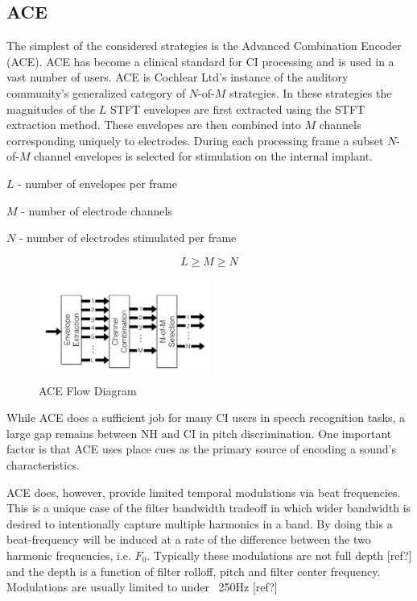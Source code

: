 \documentclass [11pt, proquest] {uwthesis}[2015/03/03]
\begin{document}
\subsection{ACE}

The simplest of the considered strategies is the Advanced Combination Encoder (ACE).  ACE has become a clinical standard for CI processing and is used in a vast number of users.  ACE is Cochlear Ltd's instance of the auditory community's generalized category of $N$-of-$M$ strategies.  In these strategies the magnitudes of the $L$ STFT envelopes are first extracted using the STFT extraction method.  These envelopes are then combined into $M$ channels corresponding uniquely to electrodes.  During each processing frame a subset $N$-of-$M$ channel envelopes is selected for stimulation on the internal implant.

$L$ - number of envelopes per frame

$M$ - number of electrode channels

$N$ - number of electrodes stimulated per frame

$$L \geq M \geq N$$

\begin{figure}[!ht]
  \centering
    \includegraphics[width=0.5\textwidth]{ACE_flow_diagram_explicitTEMP}   
    \caption{ACE Flow Diagram}
\end{figure}

While ACE does a sufficient job for many CI users in speech recognition tasks, a large gap remains between NH and CI in pitch discrimination.  One important factor is that ACE uses place cues as the primary source of encoding a sound's characteristics.

ACE does, however, provide limited temporal modulations via beat frequencies.  This is a unique case of the filter bandwidth tradeoff in which wider bandwidth is desired to intentionally capture multiple harmonics in a band.  By doing this a beat-frequency will be induced at a rate of the difference between the two harmonic frequencies, i.e. $F_0$.  Typically these modulations are not full depth [ref?] and the depth is a function of filter rolloff, pitch and filter center frequency.  Modulations are usually limited to under ~250Hz [ref?]
\end{document}

